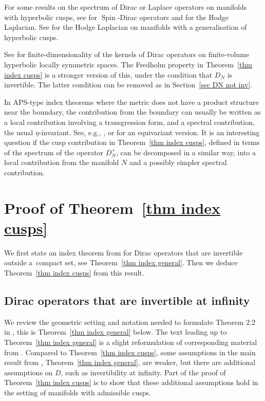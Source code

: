 \documentclass[pdftex]{sigma}%
\numberwithin{equation}{section}
\DeclareMathOperator{\Spin}{Spin}
\begin{document}
For some results on the spectrum of Dirac or Laplace operators on manifolds with hyperbolic cusps, see \cite{Baer00} for $\Spin$-Dirac operators and \cite{MP90} for the Hodge Laplacian. See \cite{Moroianu07} for the Hodge Laplacian on manifolds with a generalisation of hyperbolic cusps.

See \cite{Moscovici82} for finite-dimensionality of the kernels of Dirac operators on finite-volume hyperbolic locally symmetric spaces. The Fredholm property in Theorem~\ref{thm index cusps} is a stronger version of this, under the condition that $D_N$ is invertible. The latter condition can be removed as in Section~\ref{sec DN not inv}.

In APS-type index theorems where the metric does not have a product structure near the boundary, the contribution from the boundary can usually be written as a local contribution involving a transgression form, and a spectral contribution, the usual $\eta$-invariant. See, e.g., \cite{Gilkey93, Grubb92, Salomonsen98}, or \cite{BM19} for an equivariant version. It is an interesting question if the cusp contribution in Theorem~\ref{thm index cusps}, defined in terms of the spectrum of the operator $D_N^+$, can be decomposed in a similar way, into a local contribution from the manifold $N$ and a possibly simpler spectral contribution.

\section{Proof of Theorem~\ref{thm index cusps}}


We first state an index theorem from \cite{HW21a} for Dirac operators that are invertible outside a~compact set, see Theorem~\ref{thm index general}. Then we deduce Theorem~\ref{thm index cusps} from this result.



\subsection{Dirac operators that are invertible at infinity}\label{sec dirac ops}

We review the geometric setting and notation needed to formulate Theorem 2.2 in \cite{HW21a}, this is Theorem~\ref{thm index general} below. The text leading up to Theorem~\ref{thm index general} is a slight reformulation of corresponding material from \cite{HW21a}. Compared to Theorem~\ref{thm index cusps}, some assumptions in
 the main result from \cite{HW21a}, Theorem~\ref{thm index general}, are weaker, but there are additional assumptions on $D$, such as invertibility at infinity.
 Part of the proof of Theorem~\ref{thm index cusps} is to show that these additional assumptions hold in the setting of manifolds with admissible cusps.
\end{document}
